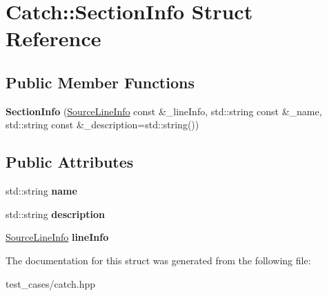 \hypertarget{structCatch_1_1SectionInfo}{}\section{Catch\+:\+:Section\+Info Struct Reference}
\label{structCatch_1_1SectionInfo}
\subsection*{Public Member Functions}
\begin{DoxyCompactItemize}
\item 
\mbox{\label{structCatch_1_1SectionInfo_a27aff3aaf8b6611f3651b17111a272c6}} 
{\bfseries Section\+Info} (\hyperlink{structCatch_1_1SourceLineInfo}{Source\+Line\+Info} const \&\+\_\+line\+Info, std\+::string const \&\+\_\+name, std\+::string const \&\+\_\+description=std\+::string())
\end{DoxyCompactItemize}
\subsection*{Public Attributes}
\begin{DoxyCompactItemize}
\item 
\mbox{\label{structCatch_1_1SectionInfo_a704c8fc662d309137e0d4f199cb7df58}} 
std\+::string {\bfseries name}
\item 
\mbox{\label{structCatch_1_1SectionInfo_a0052060219a6de74bb7ade34d4163a4e}} 
std\+::string {\bfseries description}
\item 
\mbox{\label{structCatch_1_1SectionInfo_adbc83b8a3507c4acc8ee249e93465711}} 
\hyperlink{structCatch_1_1SourceLineInfo}{Source\+Line\+Info} {\bfseries line\+Info}
\end{DoxyCompactItemize}


The documentation for this struct was generated from the following file\+:\begin{DoxyCompactItemize}
\item 
test\+\_\+cases/catch.\+hpp\end{DoxyCompactItemize}
